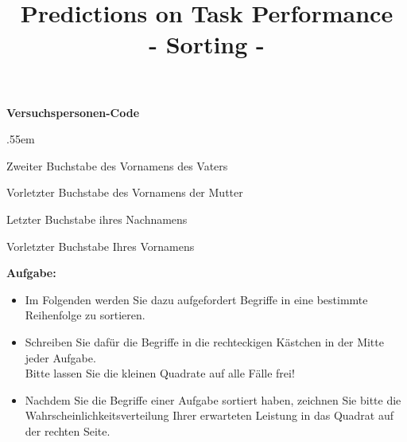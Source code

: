 \documentclass[
ngerman,
accentcolor=9c,%
identbarcolor=9c,
]{tudaexercise}
\title{Predictions on Task Performance\\- Sorting -}
\begin{document}
\maketitle
\vspace{-3mm}


\textbf{Versuchspersonen-Code}
\begin{itemize}
	\begin{minipage}{.45\textwidth}
		\vspace{-2cm}
		\itemsep.55em
		\item Zweiter Buchstabe des Vornamens des Vaters
		\item Vorletzter Buchstabe des Vornamens der Mutter
		\item Letzter Buchstabe ihres Nachnamens
		\item Vorletzter Buchstabe Ihres Vornamens	
	\end{minipage}
	\begin{minipage}{.55\textwidth}
		
	\end{minipage}
\end{itemize}

\textbf{Aufgabe:}
\begin{itemize}
	\item Im Folgenden werden Sie dazu aufgefordert Begriffe in eine bestimmte Reihenfolge zu sortieren.
	\item Schreiben Sie dafür die Begriffe in die rechteckigen Kästchen in der Mitte jeder Aufgabe.\\Bitte lassen Sie die kleinen Quadrate auf alle Fälle frei!
	\item Nachdem Sie die Begriffe einer Aufgabe sortiert haben, zeichnen Sie bitte die Wahrscheinlichkeitsverteilung Ihrer erwarteten Leistung in das  Quadrat auf der rechten Seite.
	
\end{itemize}
\end{document}
